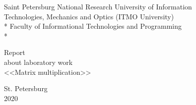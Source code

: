 \newpage
\begin{titlepage}

\begin{center}\large{
    Saint Petersburg National Research University of Information \\
    Technologies, Mechanics and Optics (ITMO University) \\*
    Faculty of Informational Technologies and Programming \\*
}\end{center}

\vspace{12em}

\begin{center}\large{
    Report \\
    about laboratory work  \\
    <<Matrix multiplication>>
}\end{center}

\vspace{8.5em}

\vspace{1.5em}

\vspace{\fill}

\begin{center}
    St. Petersburg \\
    2020
\end{center}

\end{titlepage}
